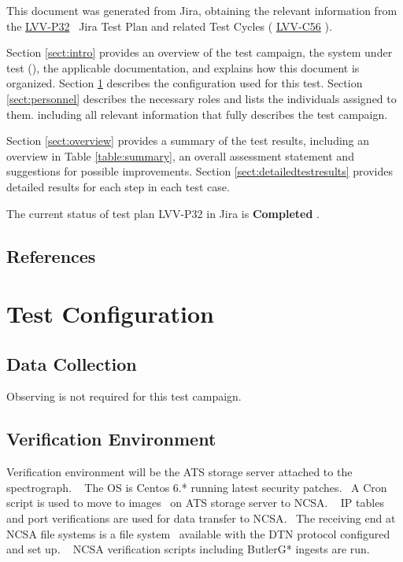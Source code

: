 \documentclass[DM,lsstdraft,STR,toc]{lsstdoc}
\begin{document}
This document was generated from Jira, obtaining the relevant information from the 
\href{https://jira.lsstcorp.org/secure/Tests.jspa#/testPlan/LVV-P32}{LVV-P32}
~Jira Test Plan and related Test Cycles (
  \href{https://jira.lsstcorp.org/secure/Tests.jspa#/testCycle/LVV-C56}{LVV-C56}
).

Section \ref{sect:intro} provides an overview of the test campaign, the system under test (\product{}),
the applicable documentation, and explains how this document is organized.
Section \ref{sect:configuration}  describes the configuration used for this test.
Section \ref{sect:personnel} describes the necessary roles and lists the individuals assigned to them.
including all relevant information that fully describes the test campaign.

Section \ref{sect:overview} provides a summary of the test results, including an overview in Table \ref{table:summary},
an overall assessment statement and suggestions for possible improvements.
Section \ref{sect:detailedtestresults} provides detailed results for each step in each test case.

The current status of test plan LVV-P32 in Jira is \textbf{ Completed }.

\subsection{References}
\label{sect:references}
\renewcommand{\refname}{}

\section{Test Configuration}
\label{sect:configuration}

\subsection{Data Collection}

  Observing is not required for this test campaign.

\subsection{Verification Environment}
\label{sect:hwconf}
  Verification environment will be the ATS storage server attached to the
spectrograph. ~ The OS is Centos 6.* running latest security patches. ~A
Cron script is used to move to images ~on ATS storage server to NCSA. ~
IP tables and port verifications are used for data transfer to NCSA.
~The receiving end at NCSA file systems is a file system ~available with
the DTN protocol configured and set up. ~ NCSA verification scripts
including ButlerG* ingests are run. ~\\[3\baselineskip]
\end{document}
